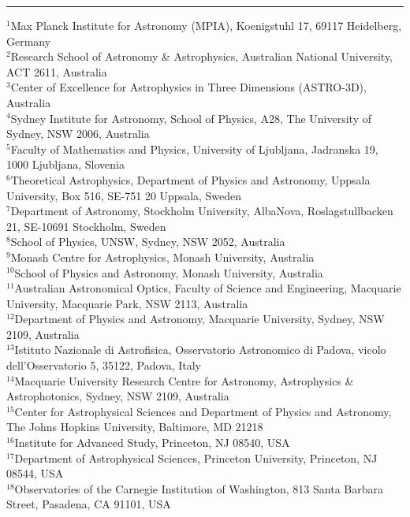 \documentclass[fleqn,usenatbib,useAMS]{mnras}
\begin{document}






\newpage
\noindent \rule{8.5cm}{1pt}

\noindent
$^{1}$Max Planck Institute  for Astronomy (MPIA), Koenigstuhl 17, 69117 Heidelberg, Germany\\
$^{2}$Research School of Astronomy \& Astrophysics, Australian National University, ACT 2611, Australia\\
$^{3}$Center of Excellence for Astrophysics in Three Dimensions (ASTRO-3D), Australia\\
$^{4}$Sydney Institute for Astronomy, School of Physics, A28, The University of Sydney, NSW 2006, Australia\\
$^{5}$Faculty of Mathematics and Physics, University of Ljubljana, Jadranska 19, 1000 Ljubljana, Slovenia\\
$^{6}$Theoretical Astrophysics, Department of Physics and Astronomy, Uppsala University, Box 516, SE-751 20 Uppsala, Sweden\\
$^{7}$Department of Astronomy, Stockholm University, AlbaNova, Roslagstullbacken 21, SE-10691 Stockholm, Sweden\\
$^{8}$School of Physics, UNSW, Sydney, NSW 2052, Australia\\
$^{9}$Monash Centre for Astrophysics, Monash University, Australia \\
$^{10}$School of Physics and Astronomy, Monash University, Australia\\
$^{11}$Australian Astronomical Optics, Faculty of Science and Engineering, Macquarie University, Macquarie Park, NSW 2113, Australia\\
$^{12}$Department of Physics and Astronomy, Macquarie University, Sydney, NSW 2109, Australia \\
$^{13}$Istituto Nazionale di Astrofisica, Osservatorio Astronomico di Padova, vicolo dell'Osservatorio 5, 35122, Padova, Italy \\
$^{14}$Macquarie University Research Centre for Astronomy, Astrophysics \& Astrophotonics, Sydney, NSW 2109, Australia\\
$^{15}$Center for Astrophysical Sciences and Department of Physics and Astronomy, The Johns Hopkins University, Baltimore, MD 21218\\
$^{16}$Institute for Advanced Study, Princeton, NJ 08540, USA \\
$^{17}$Department of Astrophysical Sciences, Princeton University, Princeton, NJ 08544, USA \\
$^{18}$Observatories of the Carnegie Institution of Washington, 813 Santa Barbara Street, Pasadena, CA 91101, USA \\
\end{document}
